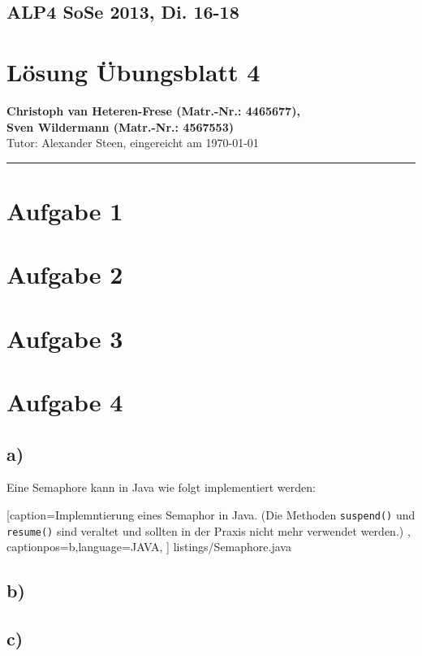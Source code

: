 \documentclass[11pt,a4paper,DIV=10,]{scrartcl}
\begin{document}
\subsection*{ALP4 SoSe 2013, Di. 16-18}
\section*{Lösung Übungsblatt 4}
\textbf{Christoph van Heteren-Frese (Matr.-Nr.: 4465677), \\ Sven Wildermann (Matr.-Nr.: 4567553)}\\
Tutor: Alexander Steen, eingereicht am \today\\
\hrule
\section*{Aufgabe 1}
\section*{Aufgabe 2}
\section*{Aufgabe 3}
\section*{Aufgabe 4}
\subsection*{a)}
Eine Semaphore kann in Java wie folgt implementiert werden:


    [caption={Implemntierung eines Semaphor in Java. (Die Methoden \texttt{suspend()} und \texttt{resume()} sind veraltet und sollten in der Praxis nicht mehr verwendet werden.) }
       \label{lst:javaclass},
       captionpos=b,language=JAVA,
       ]
{listings/Semaphore.java}
\subsection*{b)}
\subsection*{c)}



\end{document}
